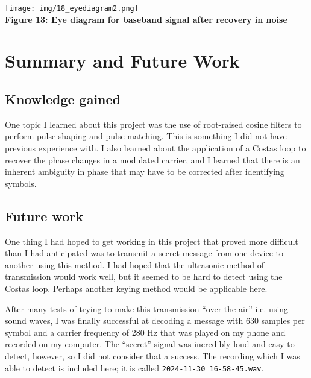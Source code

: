 \documentclass{article}
\begin{document}
\begin{center}
  \texttt{[image: img/18\_eyediagram2.png]} \\
  \textbf{Figure 13: Eye diagram for baseband signal after recovery in noise}
\end{center}


\section{Summary and Future Work}

\subsection{Knowledge gained}

One topic I learned about this project was the use of root-raised cosine filters
to perform pulse shaping and pulse matching. This is something I did not have
previous experience with. I also learned about the application of a Costas loop to recover the phase
changes in a modulated carrier, and I learned that there is an inherent ambiguity
in phase that may have to be corrected after identifying symbols.

\subsection{Future work}

One thing I had hoped to get working in this project that proved more difficult
than I had anticipated was to transmit a secret message from one device to 
another using this method. I had hoped that the ultrasonic method of transmission
would work well, but it seemed to be hard to detect using the Costas loop.
Perhaps another keying method would be applicable here.

\vspace{6pt}

After many tests of trying to make this transmission ``over the air'' i.e. using
sound waves, I was finally successful at decoding a message with 630 samples per
symbol and a carrier frequency of 280 Hz that was played on my phone and recorded
on my computer. The ``secret'' signal was incredibly loud and easy to detect,
however, so I did not consider that a success. The recording which I was able
to detect is included here; it is called \texttt{2024-11-30\_16-58-45.wav}.
\end{document}
